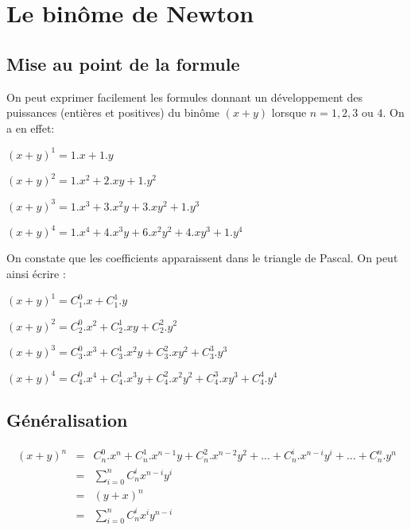 \documentclass[12pt]{article}
\begin{document}
\section*{Le binôme de Newton}
\subsection*{Mise au point de la formule}
On peut exprimer facilement les formules donnant un développement des puissances (entières et positives) du binôme $(x+y)$ lorsque $n=1, 2, 3$ ou $4$. On a en effet:\vspace{8pt}

$(x+y)^1=1.x+1.y$\vspace{6pt}

$(x+y)^2=1.x^2+2.xy+1.y^2$\vspace{6pt}

$(x+y)^3=1.x^3+3.x^2y+3.xy^2+1.y^3$\vspace{6pt}

$(x+y)^4=1.x^4+4.x^3y+6.x^2y^2+4.xy^3+1.y^4$\vspace{2pt}

\begin{flushleft}On constate que les coefficients apparaissent dans le triangle de Pascal. On peut ainsi écrire :\end{flushleft}

$(x+y)^1=C_1^0.x+C_1^1.y$\vspace{6pt}

$(x+y)^2=C_2^0.x^2+C_2^1.xy+C_2^2.y^2$\vspace{6pt}

$(x+y)^3=C_3^0.x^3+C_3^1.x^2y+C_3^2.xy^2+C_3^3.y^3$\vspace{6pt}

$(x+y)^4=C_4^0.x^4+C_4^1.x^3y+C_4^2.x^2y^2+C_4^3.xy^3+C_4^4.y^4$

\subsection*{Généralisation}


\begin{eqnarray*}
(x+y)^n&=&C_n^0.x^n+C_n^1.x^{n-1}y+C_n^2.x^{n-2}y^2+...+C_n^i.x^{n-i}y^i+...+C_n^n.y^n\\
&=&\sum_{i=0}^n C_n^ix^{n-i}y^i\\
&=&(y+x)^n\\
&=&\sum_{i=0}^n C_n^ix^iy^{n-i}\\
\end{eqnarray*}
\end{document}
